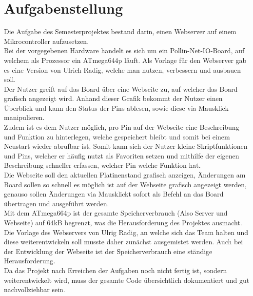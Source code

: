 \chapter{Aufgabenstellung}

Die Aufgabe des Semesterprojektes bestand darin, einen Webserver auf einem Mikrocontroller aufzusetzen.\\
Bei der vorgegebenen Hardware handelt es sich um ein Pollin-Net-IO-Board, auf welchem als Prozessor ein ATmega644p 
läuft. Als Vorlage für den Webserver gab es eine Version von Ulrich Radig, welche man nutzen, verbessern und ausbauen soll.\\
Der Nutzer greift auf das Board über eine Webseite zu, auf welcher das Board grafisch angezeigt wird. Anhand dieser Grafik 
bekommt der Nutzer einen Überblick und kann den Status der Pins ablesen, sowie diese via Mausklick manipulieren.\\
Zudem ist es dem Nutzer möglich, pro Pin auf der Webseite eine Beschreibung und Funktion zu 
hinterlegen, welche gespeichert bleibt und somit bei einem Neustart wieder abrufbar ist. Somit kann sich der Nutzer kleine Skriptfunktionen und Pins, 
welcher er häufig nutzt als Favoriten setzen und mithilfe der eigenen Beschreibung schneller erfassen, welcher Pin welche Funktion hat.\\
Die Webseite soll den aktuellen Platinenstand grafisch anzeigen, Änderungen am Board sollen so 
schnell es möglich ist auf der Webseite grafisch angezeigt werden, genauso sollen Änderungen via Mausklickt sofort als Befehl 
an das Board übertragen und ausgeführt werden.\\
Mit dem ATmega664p ist der gesamte Speicherverbrauch (Also Server und Webseite) auf 64kB begrenzt, was die Herausforderung des  
Projektes ausmacht. Die Vorlage des Webservers von Ulrig Radig, an welche sich das Team halten und diese weiterentwickeln soll 
musste daher zunächst ausgemistet werden. Auch bei der Entwicklung der Webseite ist der Speicherverbrauch eine ständige Herausforderung.\\
Da das Projekt nach Erreichen der Aufgaben noch nicht fertig ist, sondern weiterentwickelt wird, muss der gesamte Code übersichtlich 
dokumentiert und gut nachvollziehbar sein.
